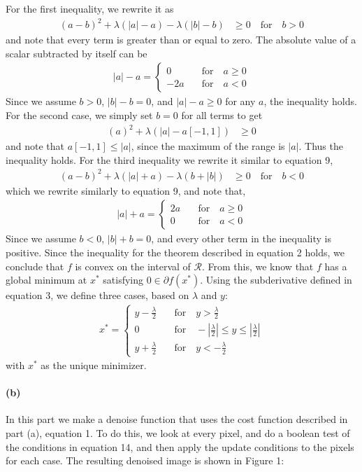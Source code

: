 \documentclass{article}
\newcommand{\spart}[1]{\paragraph{(#1)}}
\begin{document}
For the first inequality, we rewrite it as 
\begin{align}
	(a-b)^2+\lambda(|a|-a) - \lambda(|b|-b) &\geq 0 \quad \text{for} \quad b>0
\end{align}
and note that every term is greater than or equal to zero. The absolute value of a scalar subtracted by itself can be
\begin{align}
	|a|-a = \begin{cases}
		0 \quad &\text{for} \quad a \geq 0 \\
		-2a \quad &\text{for} \quad a<0
		\end{cases}
\end{align}
Since we assume $b>0$, $|b|-b = 0$, and $|a|-a\geq 0$ for any $a$, the inequality holds. For the second case, we simply set $b=0$ for all terms to get
\begin{align}
	(a)^2+\lambda(|a|-a[-1,1]) &\geq 0 
\end{align}
and note that $a[-1,1] \leq |a|$, since the maximum of the range is $|a|$. Thus the inequality holds. For the third inequality we rewrite it similar to equation 9,
\begin{align}
	(a-b)^2+\lambda(|a|+a) - \lambda(b+|b|) &\geq 0 \quad \text{for} \quad b<0
\end{align}
which we rewrite similarly to equation 9, and note that, 
\begin{align}
	|a|+a = \begin{cases}
		2a \quad &\text{for} \quad a \geq 0 \\
		0 \quad &\text{for} \quad a<0
	\end{cases}
\end{align}
Since we assume $b<0$, $|b|+b=0$, and every other term in the inequality is positive. Since the inequality for the theorem described in equation 2 holds, we conclude that $f$ is convex on the interval of $\mathcal{R}$. From this, we know that $f$ has a global minimum at $x^*$ satisfying $0\in \partial f(x^*)$. Using the subderivative defined in equation 3, we define three cases, based on $\lambda$ and $y$:
\begin{align}
	x^* = \begin{cases}
	 y - \frac{\lambda}{2} &\quad \text{for} \quad y > \frac{\lambda}{2} \\
	 0 &\quad \text{for} \quad -\left| \frac{\lambda}{2} \right|\leq y \leq \left| \frac{\lambda}{2}\right| \\
	 y + \frac{\lambda}{2} &\quad \text{for} \quad y < - \frac{\lambda}{2} 
	\end{cases}
\end{align}
with $x^*$ as the unique minimizer. 
\spart{b} In this part we make a denoise function that uses the cost function described in part (a), equation 1. To do this, we look at every pixel, and do a boolean test of the conditions in equation 14, and then apply the update conditions to the pixels for each case. The resulting denoised image is shown in Figure 1:
\end{document}
